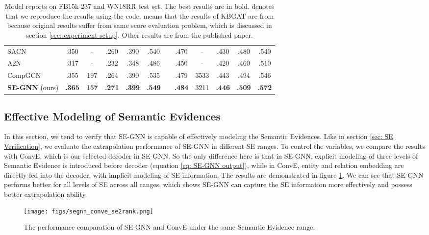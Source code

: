 \documentclass[letterpaper]{article} \usepackage{aaai22}  \usepackage{times}  \usepackage{helvet}  \usepackage{courier}  \usepackage[hyphens]{url}  \usepackage{graphicx} \urlstyle{rm} \def\UrlFont{\rm}  \usepackage{natbib}  \usepackage{caption} \DeclareCaptionStyle{ruled}{labelfont=normalfont,labelsep=colon,strut=off} \frenchspacing  \setlength{\pdfpagewidth}{8.5in}  \setlength{\pdfpageheight}{11in}  \usepackage{algorithm}
\begin{document}
\begin{table*}
\begin{tabular}{lccccccccccc}
      SACN \cite{AAAI_2019_Shang_SACN}         & .350 & -   & .260 & .390 & .540 & & .470 & -    & .430 & .480 & .540\\
      A2N \cite{ACL_2019_Bansal_A2N}         & .317 & -   & .232 & .348 & .486 &  & .450 & -    & .420 & .460 & .510\\
      CompGCN\cite{ICLR_2020_Vashishth_CompGCN}       & .355 & 197 & .264 & .390 & .535 & & .479 & 3533 & .443 & .494 & .546 \\
      \hline
        \textbf{SE-GNN} (ours)        & \textbf{.365} & \textbf{157} & \textbf{.271} & \textbf{.399} & \textbf{.549} & & \textbf{.484} & 3211 & \textbf{.446} & \textbf{.509} & \textbf{.572}\\
      \bottomrule
    \end{tabular}
    \caption{
    Model reports on FB15k-237 and WN18RR test set. The best results are in bold.  denotes that we reproduce the results using the code\footnotemark.  means that the results of KBGAT are from \cite{ACL_2020_Sun_re-eval} because original results suffer from same score evaluation problem, which is discussed in section \ref{sec: experiment setup}. 
    Other results are from the published paper.
    }
    \label{tab: kgc result}
\end{table*}

\subsection{Effective Modeling of Semantic Evidences}

In this section, we tend to verify that SE-GNN is capable of effectively modeling the Semantic Evidences. Like in section \ref{sec: SE Verification}, we evaluate the extrapolation performance of SE-GNN in different SE ranges. To control the variables, we compare the results with ConvE, which is our selected decoder in SE-GNN. So the only difference here is that in SE-GNN, explicit modeling of three levels of Semantic Evidence is introduced before decoder (equation \ref{eq: SE-GNN output}), while in ConvE, entity and relation embedding are directly fed into the decoder, 
with implicit modeling of SE information. 
The results are demonstrated in figure \ref{fig: segnn_conve_se2rank}. We can see that SE-GNN performs better for all levels of SE across all ranges, which shows SE-GNN can capture the SE information more effectively and possess better extrapolation ability.

\begin{figure}[t]
    \centering
    \texttt{[image: figs/segnn\_conve\_se2rank.png]}
    \caption{The performance comparation of SE-GNN and ConvE under the same Semantic Evidence range.}
    \label{fig: segnn_conve_se2rank}
\end{figure}
\end{document}
